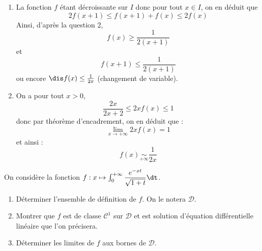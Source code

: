 \documentclass[a4paper,10pt]{report}
\begin{document}
\begin{enumerate}
	\item La fonction $f$ \'etant d\'ecroissante sur $I$ donc pour tout $x \in I$, on en d\'eduit que 
	$$2f(x+1) \le f(x+1)+f(x) \le 2f(x)$$
Ainsi, d'après la question 2, 
$$f(x)\ge \frac1{2(x+1)}$$
 et $$f(x+1) \le \frac1{2(x+1)}$$
ou encore $\dis f(x) \le \frac1{2x}$ (changement de variable).

	\item On a pour tout $x>0$,
$$\frac{2x}{2x+2} \le 2xf(x) \le 1$$ 
donc par théorème d'encadrement, on en déduit que :
$$\lim\limits_{x\to+\infty}2xf(x)=1$$
et ainsi :
$$ f(x) \underset{+\infty}\sim \frac1{2x}$$
	\end{enumerate}



\begin{Exa} On considère la fonction $f : x \mapsto \int_0^{+ \infty} \dfrac{e^{-xt}}{\sqrt{1+t}} \dt$.
\begin{enumerate}
\item Déterminer l'ensemble de définition de $f$. On le notera $\mathcal{D}$.
\item Montrer que $f$ est de classe $\mathcal{C}^1$ sur $\mathcal{D}$ et est solution d'équation différentielle linéaire que l'on précisera.
\item Déterminer les limites de $f$ aux bornes de $\mathcal{D}$.
\end{enumerate}
\end{Exa}

\corr 
\end{document}
